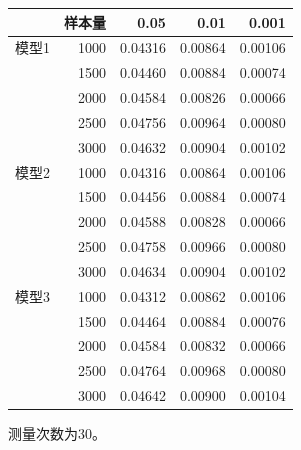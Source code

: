 \begin{table}[htbp]
\centering
{}
\label{tab:ch03-06}
\begin{tabular}{lrrrr}
\toprule
& 样本量 & 0.05 & 0.01 & 0.001\\
\midrule
模型1 & 1000 & 0.04316 & 0.00864 & 0.00106\\
 & 1500 & 0.04460 & 0.00884 & 0.00074\\
 & 2000 & 0.04584 & 0.00826 & 0.00066\\
 & 2500 & 0.04756 & 0.00964 & 0.00080\\
 & 3000 & 0.04632 & 0.00904 & 0.00102\\
\addlinespace
模型2 & 1000 & 0.04316 & 0.00864 & 0.00106\\
 & 1500 & 0.04456 & 0.00884 & 0.00074\\
 & 2000 & 0.04588 & 0.00828 & 0.00066\\
 & 2500 & 0.04758 & 0.00966 & 0.00080\\
 & 3000 & 0.04634 & 0.00904 & 0.00102\\
\addlinespace
模型3 & 1000 & 0.04312 & 0.00862 & 0.00106\\
 & 1500 & 0.04464 & 0.00884 & 0.00076\\
 & 2000 & 0.04584 & 0.00832 & 0.00066\\
 & 2500 & 0.04764 & 0.00968 & 0.00080\\
 & 3000 & 0.04642 & 0.00900 & 0.00104\\
\bottomrule
\end{tabular}
\par\smallskip
\begin{minipage}{0.78\textwidth}\footnotesize
测量次数为30。
\end{minipage}
\end{table}
